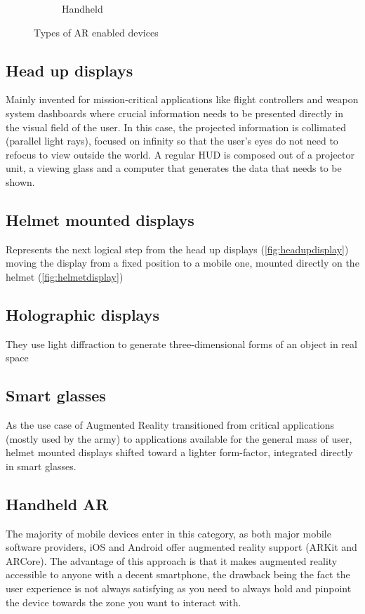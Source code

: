 \documentclass[12 pct]{report}
\begin{document}
\begin{figure}[h!]
\begin{subfigure}[b]{0.4\linewidth}
    \caption{Handheld}
  \end{subfigure}
  \caption{Types of AR enabled devices}
  \label{fig:artypes}
\end{figure}

\subsection*{Head up displays}
Mainly invented for mission-critical applications \cite{livingston2011military} like flight controllers and weapon system dashboards where crucial information needs to be presented directly in the visual field of the user. In this case, the projected information is collimated (parallel light rays), focused on infinity so that the user’s eyes do not need to refocus to view outside the world.
A regular HUD \cite{beckwith2015augmented} is composed out of a projector unit, a viewing glass and a computer that generates the data that needs to be shown.

\subsection*{Helmet mounted displays}
Represents the next logical step from the head up displays (\ref{fig:headupdisplay}) moving the display from a fixed position to a mobile one, mounted directly on the helmet (\ref{fig:helmetdisplay})

\subsection*{Holographic displays}
They use light diffraction \cite{lucente1997interactive} to generate three-dimensional forms of an object in real space

\subsection*{Smart glasses}
As the use case of Augmented Reality transitioned from critical applications (mostly used by the army) to applications available for the general mass of user, helmet mounted displays shifted toward a lighter form-factor, integrated directly in smart glasses. 

\subsection*{Handheld AR}
The majority of mobile devices enter in this category, as both major mobile software providers, iOS \cite{wilson2007iphone} and Android \cite{rogers2009android} offer augmented reality support (ARKit and ARCore). The advantage of this approach is that it makes augmented reality accessible to anyone with a decent smartphone, the drawback being the fact the user experience is not always satisfying as you need to always hold and pinpoint the device towards the zone you want to interact with.
\end{document}
